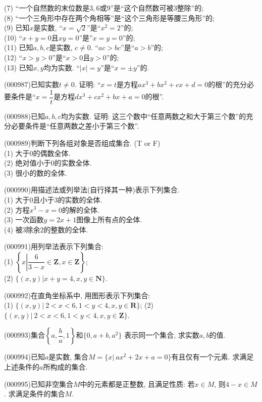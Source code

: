 (7) ``一个自然数的末位数是$3,6$或$9$''是``这个自然数可被$3$整除''的;\\ 
(8) ``一个三角形中存在两个角相等''是``这个三角形是等腰三角形''的;\\ 
(9) 已知$x$是实数, ``$x=\sqrt{2}$''是``$x^2=2$''的;\\ 
(10) ``$x+y=0$且$xy=0$''是''$x=y=0$''的;\\ 
(11) 已知$a,b,c$是实数, $c \ne 0$. ``$ac>bc$''是``$a>b$''的;\\ 
(12) ``$x>y>0$''是``$x>0$且$y>0$''的;\\ 
(13) 已知$x,y$均为实数. ``$|x|=y$''是``$x=\pm y$''的.
\item (000987)已知实数$t\ne 0$. 证明: ``$x=t$是方程$a x^3+b x^2+cx+d=0$的根''的充分必要条件是``$x=\dfrac{1}{t}$是方程$d x^3+c x^2+ b x+a=0$的根''.
\item (000988)已知$a,b,c$均为实数. 证明: 这三个数中``任意两数之和大于第三个数''的充分必要条件是``任意两数之差小于第三个数''.
\item (000989)判断下列各组对象是否组成集合. (T or F)\\ 
 (1) 大于$0$的偶数全体.\\ 
 (2) 绝对值小于$0$的实数全体.\\ 
 (3) 很小的数的全体.
\item (000990)用描述法或列举法(自行择其一种)表示下列集合.\\ 
(1) 大于$0$且小于$3$的实数的全体.\\ 
(2) 方程$x^3-x=0$的解的全体.\\ 
(3) 一次函数$y=2x+1$图像上所有点的全体.\\ 
(4) 被$3$除余$2$的整数的全体.
\item (000991)用列举法表示下列集合:\\ 
(1) $\left\{x\left| \dfrac{6}{3-x}\in\mathbf{Z},x\in\mathbf{Z}\right.\right\}$;\\ 
(2) $\{(x,y)|x+y=4,x,y\in\mathbf{N}\}$.
\item (000992)在直角坐标系中, 用图形表示下列集合:\\ 
(1) $\{(x,y)|\ 2<x<6,1<y<4,x,y\in\mathbf{R}\}$; \hfill (2) $\{(x,y)|\ 2<x<6,1<y<4,x,y\in\mathbf{Z}\}$.
\item (000993)集合$\left\{a,\dfrac{b}{a},1\right\}$和$\{0,a+b,a^2\}$ 表示同一个集合, 求实数$a,b$的值.
\item (000994)已知$a$是实数, 集合$M=\{x|\ ax^2+2x+a=0\}$有且仅有一个元素. 求满足上述条件的$a$所构成的集合.
\item (000995)已知非空集合$M$中的元素都是正整数, 且满足性质: 若$x\in M$, 则$4-x\in M$. 求满足条件的集合$M$.
